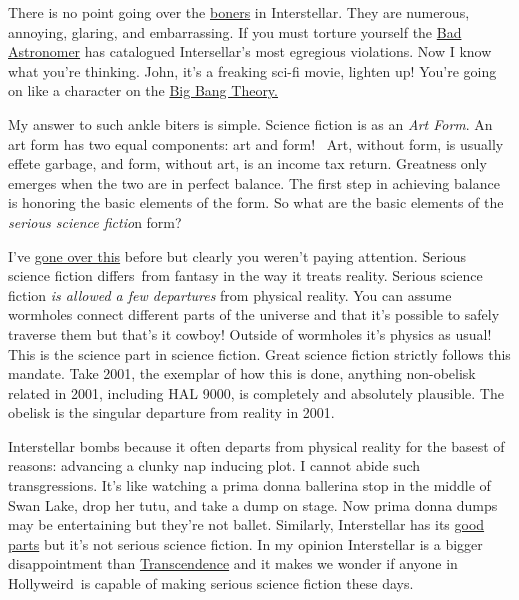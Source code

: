 There is no point going over the
\href{http://guycodeblog.mtv.com/2013/01/15/weird-boner-facts/}{boners}
in Interstellar. They are numerous, annoying, glaring, and embarrassing.
If you must torture yourself the
\href{http://www.slate.com/articles/health\_and\_science/space\_20/2014/11/interstellar\_science\_review\_the\_movie\_s\_black\_holes\_wormholes\_relativity.html}{Bad
Astronomer} has catalogued Intersellar's most egregious violations. Now
I know what you're thinking. John, it's a freaking sci-fi movie, lighten
up! You're going on like a character on the
\href{http://www.cbs.com/shows/big\_bang\_theory/}{Big Bang Theory.}

My answer to such ankle biters is simple. Science fiction is as an
\emph{Art Form}. An art form has two equal components: art and form!~
Art, without form, is usually effete garbage, and form, without art, is
an income tax return. Greatness only emerges when the two are in perfect
balance. The first step in achieving balance is honoring the basic
elements of the form. So what are the basic elements of the
\emph{serious science fictio}n form?

I've
\href{http://bakerjd99.wordpress.com/2014/09/01/pandoras-star-a-grand-sprawling-entertainment/}{gone
over this} before but clearly you weren't paying attention. Serious
science fiction differs~from fantasy in the way it treats reality.
Serious science fiction \emph{is allowed a few departures} from physical
reality. You can assume wormholes connect different parts of the
universe and that it's possible to safely traverse them but that's it
cowboy! Outside of wormholes it's physics as usual! This is the science
part in science fiction. Great science fiction strictly follows this
mandate. Take 2001, the exemplar of how this is done, anything
non-obelisk related in 2001, including HAL 9000, is completely and
absolutely plausible. The obelisk is the singular departure from reality
in 2001.

Interstellar bombs because it often departs from physical reality for
the basest of reasons: advancing a clunky nap inducing plot. I cannot
abide such transgressions. It's like watching a prima donna ballerina
stop in the middle of Swan Lake, drop her tutu, and take a dump on
stage. Now prima donna dumps may be entertaining but they're not ballet.
Similarly, Interstellar has its
\href{https://www.youtube.com/watch?v=wPiHQ37gXnE}{good parts} but it's
not serious science fiction. In my opinion Interstellar is a bigger
disappointment than
\href{http://bakerjd99.wordpress.com/2014/04/18/whats-the-opposite-of-transcendence/}{Transcendence}
and it makes we wonder if anyone in Hollyweird~is capable of making
serious science fiction these days.




%